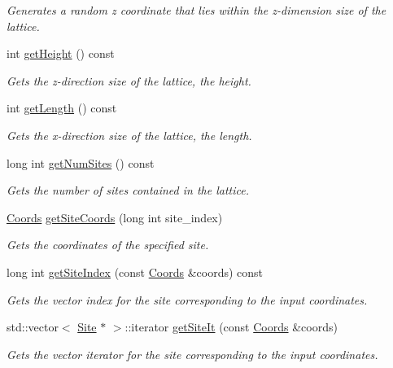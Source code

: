 \begin{DoxyCompactItemize}
\begin{DoxyCompactList}\small\item\em Generates a random z coordinate that lies within the z-\/dimension size of the lattice. \end{DoxyCompactList}\item 
int \hyperlink{class_lattice_aaa0cba3ab33ac620d9b9f9508c56d1ac}{get\+Height} () const
\begin{DoxyCompactList}\small\item\em Gets the z-\/direction size of the lattice, the height. \end{DoxyCompactList}\item 
int \hyperlink{class_lattice_a4b43b67a36fcd3dfe62c9eeaffa561d2}{get\+Length} () const
\begin{DoxyCompactList}\small\item\em Gets the x-\/direction size of the lattice, the length. \end{DoxyCompactList}\item 
long int \hyperlink{class_lattice_a4be17e9123f7737387991a9d1a8b87b3}{get\+Num\+Sites} () const
\begin{DoxyCompactList}\small\item\em Gets the number of sites contained in the lattice. \end{DoxyCompactList}\item 
\hyperlink{struct_coords}{Coords} \hyperlink{class_lattice_a74a170b841ad1b74dad43519d37e9eaf}{get\+Site\+Coords} (long int site\+\_\+index)
\begin{DoxyCompactList}\small\item\em Gets the coordinates of the specified site. \end{DoxyCompactList}\item 
long int \hyperlink{class_lattice_a60431f6504a253d47acb0b02f524571c}{get\+Site\+Index} (const \hyperlink{struct_coords}{Coords} \&coords) const
\begin{DoxyCompactList}\small\item\em Gets the vector index for the site corresponding to the input coordinates. \end{DoxyCompactList}\item 
std\+::vector$<$ \hyperlink{class_site}{Site} $\ast$ $>$\+::iterator \hyperlink{class_lattice_a46f7d12855d24e1bdd02814621b0a178}{get\+Site\+It} (const \hyperlink{struct_coords}{Coords} \&coords)
\begin{DoxyCompactList}\small\item\em Gets the vector iterator for the site corresponding to the input coordinates. \end{DoxyCompactList}\item 

\end{DoxyCompactItemize}
